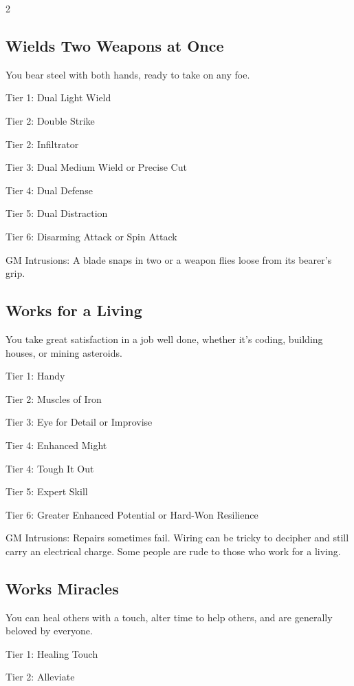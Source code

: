 \begin{multicols}{2}
\subsection{Wields Two Weapons at Once}

You bear steel with both hands, ready to take on any foe.

Tier 1: Dual Light Wield

Tier 2: Double Strike

Tier 2: Infiltrator

Tier 3: Dual Medium Wield or Precise Cut

Tier 4: Dual Defense

Tier 5: Dual Distraction

Tier 6: Disarming Attack or Spin Attack

GM Intrusions: A blade snaps in two or a weapon flies loose from its bearer’s grip.

\subsection{Works for a Living}

You take great satisfaction in a job well done, whether it’s coding, building houses, or mining asteroids.

Tier 1: Handy

Tier 2: Muscles of Iron

Tier 3: Eye for Detail or Improvise

Tier 4: Enhanced Might

Tier 4: Tough It Out

Tier 5: Expert Skill

Tier 6: Greater Enhanced Potential or Hard-Won Resilience

GM Intrusions: Repairs sometimes fail. Wiring can be tricky to decipher and still carry an electrical charge. Some people are rude to those who work for a living.

\subsection{Works Miracles}

You can heal others with a touch, alter time to help others, and are generally beloved by everyone.

Tier 1: Healing Touch

Tier 2: Alleviate


\end{multicols}
